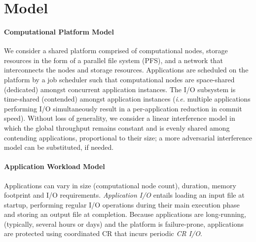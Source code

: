 \documentclass[conference,nofonttune]{IEEEtran}
\newcommand{\ie}[0]{\emph{i.e.}\xspace}
\begin{document}


%

\section{Model}
\label{sec:model}

\paragraph*{Computational Platform Model}

We consider a shared platform comprised of computational
nodes, storage resources in the form of a parallel file system (PFS), and a network
that interconnects the nodes and storage resources. Applications are
scheduled on the platform by a job scheduler such that computational nodes are
space-shared (dedicated) amongst concurrent application instances. The I/O
subsystem is time-shared (contended) amongst application instances  (\ie multiple
applications performing I/O simultaneously result in a per-application reduction
in commit speed). Without loss of generality, we consider a linear
interference model in which the global throughput remains constant and is evenly
shared among contending applications, proportional to their size; a more
adversarial interference model can be substituted, if needed.

\paragraph*{Application Workload Model}

Applications can vary in size (computational node count), duration, memory
footprint and I/O requirements.  \emph{Application I/O} entails loading an input file
at startup, performing regular I/O operations during their main execution phase and
storing an output file at completion. Because applications are long-running,
(typically, several hours or days) and the platform is failure-prone, applications
are protected using coordinated CR that incurs periodic \emph{CR I/O}.
\end{document}
